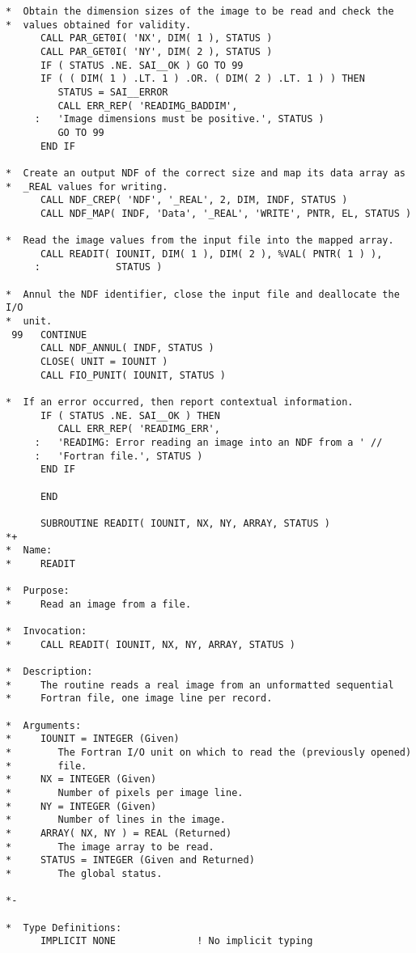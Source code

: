 \documentclass[twoside,11pt]{article}
\begin{document}
\begin{verbatim}
*  Obtain the dimension sizes of the image to be read and check the
*  values obtained for validity.
      CALL PAR_GET0I( 'NX', DIM( 1 ), STATUS )
      CALL PAR_GET0I( 'NY', DIM( 2 ), STATUS )
      IF ( STATUS .NE. SAI__OK ) GO TO 99
      IF ( ( DIM( 1 ) .LT. 1 ) .OR. ( DIM( 2 ) .LT. 1 ) ) THEN
         STATUS = SAI__ERROR
         CALL ERR_REP( 'READIMG_BADDIM',
     :   'Image dimensions must be positive.', STATUS )
         GO TO 99
      END IF

*  Create an output NDF of the correct size and map its data array as
*  _REAL values for writing.
      CALL NDF_CREP( 'NDF', '_REAL', 2, DIM, INDF, STATUS )
      CALL NDF_MAP( INDF, 'Data', '_REAL', 'WRITE', PNTR, EL, STATUS )

*  Read the image values from the input file into the mapped array.
      CALL READIT( IOUNIT, DIM( 1 ), DIM( 2 ), %VAL( PNTR( 1 ) ),
     :             STATUS )

*  Annul the NDF identifier, close the input file and deallocate the I/O
*  unit.
 99   CONTINUE     
      CALL NDF_ANNUL( INDF, STATUS )
      CLOSE( UNIT = IOUNIT )
      CALL FIO_PUNIT( IOUNIT, STATUS )

*  If an error occurred, then report contextual information.
      IF ( STATUS .NE. SAI__OK ) THEN
         CALL ERR_REP( 'READIMG_ERR',
     :   'READIMG: Error reading an image into an NDF from a ' //
     :   'Fortran file.', STATUS )
      END IF      

      END

      SUBROUTINE READIT( IOUNIT, NX, NY, ARRAY, STATUS )
*+
*  Name:
*     READIT

*  Purpose:
*     Read an image from a file.

*  Invocation:
*     CALL READIT( IOUNIT, NX, NY, ARRAY, STATUS )

*  Description:
*     The routine reads a real image from an unformatted sequential
*     Fortran file, one image line per record.

*  Arguments:
*     IOUNIT = INTEGER (Given)
*        The Fortran I/O unit on which to read the (previously opened)
*        file.
*     NX = INTEGER (Given)
*        Number of pixels per image line.
*     NY = INTEGER (Given)
*        Number of lines in the image.
*     ARRAY( NX, NY ) = REAL (Returned)
*        The image array to be read.
*     STATUS = INTEGER (Given and Returned)
*        The global status.

*-
      
*  Type Definitions:
      IMPLICIT NONE              ! No implicit typing


\end{verbatim}
\end{document}
